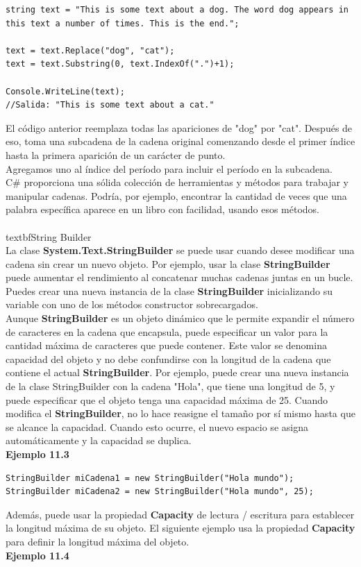 \documentclass[12pt,a4paper]{report}
\begin{document}
\begin{lstlisting}
string text = "This is some text about a dog. The word dog appears in this text a number of times. This is the end.";

text = text.Replace("dog", "cat");
text = text.Substring(0, text.IndexOf(".")+1);

Console.WriteLine(text);
//Salida: "This is some text about a cat."
\end{lstlisting}El código anterior reemplaza todas las apariciones de "dog" por "cat". Después de eso, toma una subcadena de la cadena original comenzando desde el primer índice hasta la primera aparición de un carácter de punto.\\Agregamos uno al índice del período para incluir el período en la subcadena.\\C\# proporciona una sólida colección de herramientas y métodos para trabajar y manipular cadenas. Podría, por ejemplo, encontrar la cantidad de veces que una palabra específica aparece en un libro con facilidad, usando esos métodos.\\\\textbf{String Builder}\\La clase\textbf{ System.Text.StringBuilder} se puede usar cuando desee modificar una cadena sin crear un nuevo objeto. Por ejemplo, usar la clase\textbf{ StringBuilder} puede aumentar el rendimiento al concatenar muchas cadenas juntas en un bucle.\\Puedes crear una nueva instancia de la clase\textbf{ StringBuilder} inicializando su variable con uno de los métodos constructor sobrecargados.\\Aunque \textbf{StringBuilder} es un objeto dinámico que le permite expandir el número de caracteres en la cadena que encapsula, puede especificar un valor para la cantidad máxima de caracteres que puede contener. Este valor se denomina capacidad del objeto y no debe confundirse con la longitud de la cadena que contiene el actual \textbf{StringBuilder}. Por ejemplo, puede crear una nueva instancia de la clase StringBuilder con la cadena "Hola", que tiene una longitud de 5, y puede especificar que el objeto tenga una capacidad máxima de 25. Cuando modifica el\textbf{ StringBuilder}, no lo hace reasigne el tamaño por sí mismo hasta que se alcance la capacidad. Cuando esto ocurre, el nuevo espacio se asigna automáticamente y la capacidad se duplica.\\\textbf{Ejemplo 11.3}
\begin{lstlisting}
StringBuilder miCadena1 = new StringBuilder("Hola mundo");
StringBuilder miCadena2 = new StringBuilder("Hola mundo", 25);  
\end{lstlisting}Además, puede usar la propiedad \textbf{Capacity} de lectura / escritura para establecer la longitud máxima de su objeto. El siguiente ejemplo usa la propiedad\textbf{ Capacity} para definir la longitud máxima del objeto.\\\textbf{Ejemplo 11.4}
\end{document}

